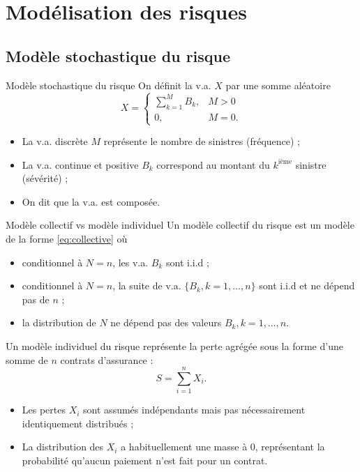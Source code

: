 \chapter{Modélisation des risques}

\section{Modèle stochastique du risque}

\begin{definition}{Modèle stochastique du risque}{}
	On définit la v.a. $X$ par une somme aléatoire 
	\begin{equation}\label{eq:collective}
		X = \begin{cases}
		\sum_{k = 1}^{M}B_k, & M>0\\
		0, & M = 0.
		\end{cases}
	\end{equation}
	
	\begin{itemize}
		\item La v.a. discrète $M$ représente le nombre de sinistres (fréquence) ;
		\item La v.a. continue et positive $B_k$ correspond au montant du $k^{\text{ième}}$ sinistre (sévérité) ;
		\item On dit que la v.a. est composée.
	\end{itemize}
\end{definition}

\begin{definition}{Modèle collectif vs modèle individuel}{}
	Un modèle collectif du risque est un modèle de la forme \ref{eq:collective} où 
	\begin{itemize}
		\item conditionnel à $N = n$, les v.a. $B_k$ sont i.i.d ;
		\item conditionnel à $N = n$, la suite de v.a. $\{B_k, k = 1, \dots, n\}$ sont i.i.d et ne dépend pas de $n$ ;
		\item la distribution de $N$ ne dépend pas des valeurs $B_k, k = 1, \dots, n$.
	\end{itemize}
	\tcblower
	Un modèle individuel du risque représente la perte agrégée sous la forme d'une somme de $n$ contrats d'assurance : $$S = \sum_{i = 1}^{n}X_i.$$
	\begin{itemize}
		\item Les pertes $X_i$ sont assumés indépendants mais pas nécessairement identiquement distribués ;
		\item La distribution des $X_i$ a habituellement une masse à 0, représentant la probabilité qu'aucun paiement n'est fait pour un contrat. 
	\end{itemize}
\end{definition}


